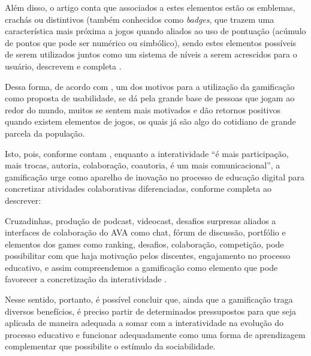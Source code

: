 Além disso, o artigo conta que associados a estes elementos estão os emblemas, crachás ou distintivos (também conhecidos como \textsl{badges}, que trazem uma característica mais próxima a jogos quando aliados ao uso de pontuação (acúmulo de pontos que pode ser numérico ou simbólico), sendo estes elementos possíveis de serem utilizados juntos como um sistema de níveis a serem acrescidos para o usuário, descrevem  e completa  .

Dessa forma, de acordo com , um dos motivos para a utilização da gamificação como proposta de usabilidade, se dá pela grande base de pessoas que jogam ao redor do mundo, muitos se sentem mais motivados e dão retornos positivos quando existem elementos de jogos, os quais já são algo do cotidiano de grande parcela da população. 

Isto, pois, conforme contam , enquanto a interatividade ``é mais participação, mais trocas, autoria, colaboração, coautoria, é um mais comunicacional'', a gamificação urge como aparelho de inovação no processo de educação digital para concretizar atividades colaborativas diferenciadas, conforme completa ao descrever:

\begin{citacao}
Cruzadinhas,  produção de  podcast,  videocast,  desafios  surpresas  aliados  a  interfaces  de colaboração do  AVA  como  chat,  fórum  de  discussão,  portfólio e  elementos  dos  games  como ranking,  desafios,  colaboração,  competição, pode  possibilitar  com  que  haja  motivação  pelos discentes, engajamento no processo educativo, e assim compreendemos a gamificação como elemento que pode favorecer a concretização da interatividade \cite{valentim2016interatividade}.
\end{citacao}

Nesse sentido, portanto, é possível concluir que, ainda que a gamificação traga diversos benefícios, é preciso partir de determinados pressupostos para que seja aplicada de maneira adequada a somar com a interatividade na evolução do processo educativo e funcionar adequadamente como uma forma de aprendizagem complementar que possibilite o estímulo da sociabilidade. 


